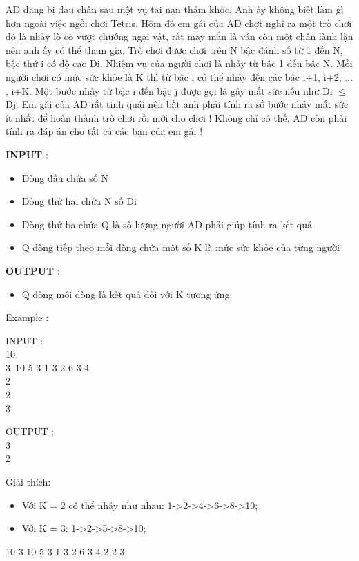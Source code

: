 



   AD đang bị đau chân sau một vụ tai nạn thảm khốc. Anh ấy không biết làm gì hơn ngoài việc ngồi chơi Tetris. Hôm đó em gái của AD chợt nghĩ ra một trò chơi đó là nhảy lò cò vượt chướng ngại vật, rất may mắn là vẫn còn một chân lành lặn nên anh ấy có thể tham gia. Trò chơi được chơi trên N bậc đánh số từ 1 đến N, bậc thứ i có độ cao Di. Nhiệm vụ của người chơi là nhảy từ bậc 1 đến bậc N. Mỗi người chơi có mức sức khỏe là K thì từ bậc i có thể nhảy đến các bậc i+1, i+2, ... , i+K. Một bước nhảy từ bậc i đến bậc j được gọi là gây mất sức nếu như Di  $\le$  Dj. Em gái của AD rất tinh quái nên bắt anh phải tính ra số bước nhảy mất sức ít nhất để hoàn thành trò chơi rồi mới cho chơi ! Không chỉ có thế, AD còn phải tính ra đáp án cho tất cả các bạn của em gái !  

\textbf{    INPUT   }   :  
\begin{itemize}
	\item     Dòng đầu chứa số N   
	\item     Dòng thứ hai chứa N số Di   
	\item     Dòng thứ ba chứa Q là số lượng người AD phải giúp tính ra kết quả   
	\item     Q dòng tiếp theo mỗi dòng chứa một số K là mức sức khỏe của từng người   
\end{itemize}

\textbf{    OUTPUT   }   :  
\begin{itemize}
	\item     Q dòng mỗi dòng là kết quả đối với K tương ứng.   
\end{itemize}

    Example      :  

INPUT   :   
\\   10   
\\   3 10 5 3 1 3 2 6 3 4   
\\   2   
\\   2   
\\   3  

OUTPUT   :   
\\   3   
\\   2  

   Giải thích:  
\begin{itemize}
	\item     Với K = 2 có thể nhảy như nhau: 1->2->4->6->8->10;   
	\item     Với K = 3: 1->2->5->8->10;   
\end{itemize}     10       3 10 5 3 1 3 2 6 3 4       2       2       3    

